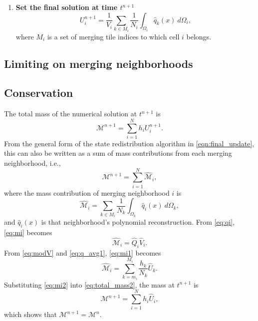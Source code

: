 \begin{enumerate}
\item \textbf{Set the final solution at time $t^{n+1}$}
	\begin{equation}\label{eq:final_update}
	U^{n+1}_i =  \frac{1}{V_i}\sum_{k \in M_{i}}\frac{1}{N_i}\int_{\Omega_i} \hat q_k(x)~d\Omega_i,
	\end{equation}
	where $M_i$ is a set of merging tile indices to which cell $i$ belongs.
\end{enumerate}

\subsection{Limiting on merging neighborhoods}


\subsection{Conservation}\label{sec:cons}
The total mass of the numerical solution at $t^{n+1}$ is
\begin{equation}\label{eq:total_mass}
\mathcal{M}^{n+1} = \sum^N_{i=1} h_i U^{n+1}_i.
\end{equation}
From the general form of the state redistribution algorithm 
in \eqref{eqn:final_update}, 
this can also be written as a sum of mass contributions from each 
merging neighborhood, i.e.,
\begin{equation}\label{eq:total_mass2}
\mathcal{M}^{n+1} = \sum^N_{i=1} \hat{\mathcal{M}}_i,
\end{equation}
where the mass contribution of merging neighborhood $i$ is
\begin{equation}\label{eq:mi}
\hat{\mathcal{M}}_i = \sum_{k \in M_i}\frac{1}{N_k} \int_{\Omega_k}\hat q_i(x) ~d\Omega_k,
\end{equation}
and $\hat q_i(x)$ is that neighborhood's polynomial reconstruction.  
From \eqref{eq:qi}, \eqref{eq:mi} becomes
\begin{equation}\label{eq:mi1}
\hat{\mathcal{M}}_i = \hat Q_i \hat V_i.
\end{equation}
From \eqref{eq:modV} and \eqref{eq:q_avg1}, \eqref{eq:mi1} becomes
\begin{equation}\label{eq:mi2}
\hat{\mathcal{M}}_i = \sum^{M_i}_{k = m_i}\frac{h_k}{N_k} \hat U_{k}.
\end{equation}
Substituting \eqref{eq:mi2} into \eqref{eq:total_mass2}, the mass at $t^{n+1}$ is
$$
\mathcal{M}^{n+1} = \sum^{N}_{i=1} h_i \hat U_i,
$$
which shows that $\mathcal{M}^{n+1}  = \mathcal{M}^{n} $.

	
